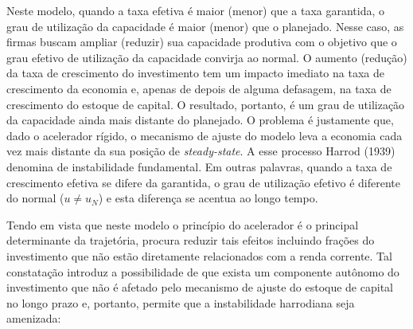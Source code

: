 Neste modelo, quando a taxa efetiva é maior (menor) que a taxa garantida, o grau de utilização da capacidade é maior (menor) que o planejado. Nesse caso, as firmas buscam ampliar (reduzir) sua capacidade produtiva com o objetivo que o grau efetivo de utilização da capacidade convirja ao normal. O aumento (redução) da taxa de crescimento do investimento tem um impacto imediato na taxa de crescimento da
economia e, apenas de depois de alguma defasagem, na taxa de crescimento do estoque de capital. O resultado, portanto, é um grau de utilização da capacidade ainda mais distante do planejado. O problema é justamente que, dado o acelerador rígido, o mecanismo de ajuste do modelo leva a economia cada vez mais distante da sua posição de \textit{steady-state}. A esse processo Harrod (1939) denomina de instabilidade fundamental. Em outras palavras, quando a taxa de crescimento efetiva se difere  da garantida, o grau de utilização efetivo é diferente do normal ($u\neq u_N$) e esta diferença se acentua ao longo tempo.






Tendo em vista que neste modelo o princípio do acelerador é o principal determinante da trajetória, \textcite[p.~26--28]{harrod_essay_1939} procura reduzir tais efeitos incluindo frações do investimento que não estão diretamente relacionados com a renda corrente. Tal constatação introduz a possibilidade de que exista um componente autônomo do investimento que não é afetado pelo mecanismo de ajuste do estoque de capital no longo prazo e, portanto, permite que a instabilidade harrodiana seja amenizada:

